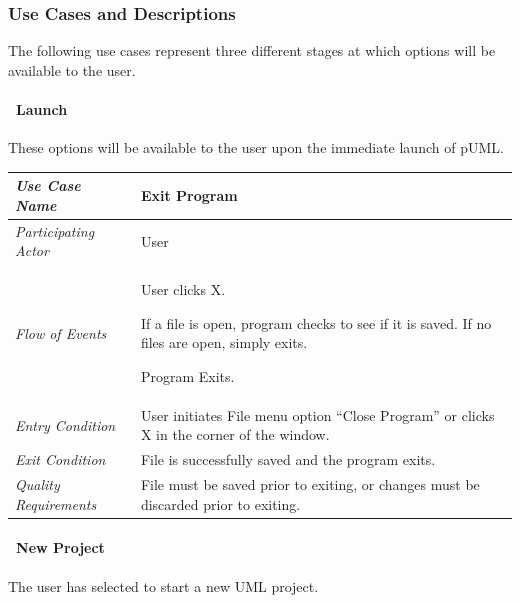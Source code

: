 \documentclass[twoside,letterpaper]{article}
\newenvironment{my_enumerate}{
\begin{enumerate}
  \setlength{\itemsep}{1pt}
  \setlength{\parskip}{0pt}
  \setlength{\parsep}{0pt}}{\end{enumerate}
}
\begin{document}
\subsubsection{Use Cases and Descriptions}
{The following use cases represent three different stages at which options will be available to the user.}

\bigskip
\bigskip

\paragraph[\ Use Category]
{\ Launch} {These options will be available to the user upon the immediate launch of pUML.}



\begin{flushleft}
\tablehead{}
\begin{tabular}{|m{2.0in} m{5.0in}|}
\hline
{\bfseries\emph{Use Case Name}}
& {\bfseries Exit Program}
\\\hline
\emph{Participating Actor}
& User
\\\hline
\emph{Flow of Events}
& \begin{my_enumerate}
\item User clicks X.
\item If a file is open, program checks to see if it is saved.  If no files are open, simply exits.
\item Program Exits.
\end{my_enumerate}
\\\hline
\emph{Entry Condition}
&
User initiates File menu option ``Close Program'' or clicks X in the corner of the window.
\\\hline
\emph{Exit Condition}
& File is successfully saved and the program exits.
\\\hline
\emph{Quality Requirements}
& File must be saved prior to exiting, or changes must be discarded prior to exiting.
\\\hline
\end{tabular}
\end{flushleft}
\bigskip

\clearpage

\paragraph[\ Use Category]
{\ New Project} 
{The user has selected to start a new UML project.}
\end{document}
